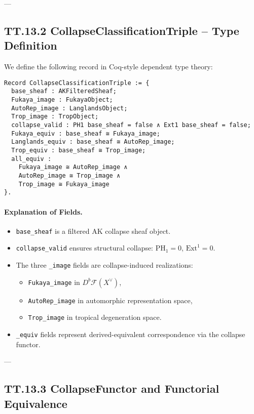 \documentclass[11pt]{article}
\begin{document}
{---

\subsection*{TT.13.2 CollapseClassificationTriple – Type Definition}

We define the following record in Coq-style dependent type theory:

\begin{verbatim}
Record CollapseClassificationTriple := {
  base_sheaf : AKFilteredSheaf;
  Fukaya_image : FukayaObject;
  AutoRep_image : LanglandsObject;
  Trop_image : TropObject;
  collapse_valid : PH1 base_sheaf = false ∧ Ext1 base_sheaf = false;
  Fukaya_equiv : base_sheaf ≅ Fukaya_image;
  Langlands_equiv : base_sheaf ≅ AutoRep_image;
  Trop_equiv : base_sheaf ≅ Trop_image;
  all_equiv :
    Fukaya_image ≅ AutoRep_image ∧
    AutoRep_image ≅ Trop_image ∧
    Trop_image ≅ Fukaya_image
}.
\end{verbatim}

\paragraph{Explanation of Fields.}
\begin{itemize}
  \item \texttt{base\_sheaf} is a filtered AK collapse sheaf object.
  \item \texttt{collapse\_valid} ensures structural collapse: \( \mathrm{PH}_1 = 0 \), \( \mathrm{Ext}^1 = 0 \).
  \item The three \texttt{\_image} fields are collapse-induced realizations:
    \begin{itemize}
      \item \texttt{Fukaya\_image} in \( D^b\mathcal{F}(X^\vee) \),
      \item \texttt{AutoRep\_image} in automorphic representation space,
      \item \texttt{Trop\_image} in tropical degeneration space.
    \end{itemize}
  \item \texttt{\_equiv} fields represent derived-equivalent correspondence via the collapse functor.
\end{itemize}

---

\subsection*{TT.13.3 CollapseFunctor and Functorial Equivalence}

}
\end{document}
